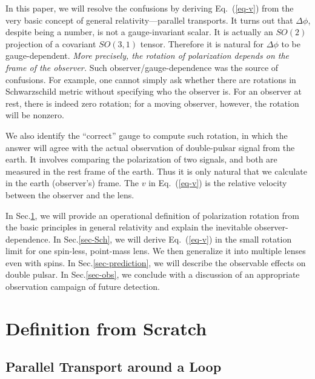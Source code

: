 \documentclass[aps,showpacs,twocolumn,floats,prd,superscriptaddress,nofootinbib]{revtex4-1}
\begin{document}
In this paper, we will resolve the confusions by deriving Eq.~(\ref{eq-v}) from the very basic concept of general relativity---parallel transports. 
It turns out that $\Delta\phi$, despite being a number, is not a gauge-invariant scalar.
It is actually an $SO(2)$ projection of a covariant $SO(3,1)$ tensor.
Therefore it is natural for $\Delta\phi$ to be gauge-dependent.
 {\it More precisely, the rotation of polarization depends on the frame of the observer. }
Such observer/gauge-dependence was the source of confusions.
For example, one cannot simply ask whether there are rotations in Schwarzschild metric without specifying who the observer is.
For an observer at rest, there is indeed zero rotation; 
for a moving observer, however, the rotation will be nonzero.

We also identify the ``correct'' gauge to compute such rotation, in which the answer will agree with the actual observation of double-pulsar signal from the earth.
It involves comparing the polarization of two signals, and both are measured in the rest frame of the earth.
Thus it is only natural that we calculate in the earth (observer's) frame.
The $v$ in Eq.~(\ref{eq-v}) is the relative velocity between the observer and the lens.

In Sec.\ref{sec-born}, we will provide an operational definition of polarization rotation from the basic principles in general relativity and explain the inevitable observer-dependence.
In Sec.\ref{sec-Sch}, we will derive Eq.~(\ref{eq-v}) in the small rotation limit for one spin-less, point-mass lens. 
We then generalize it into multiple lenses even with spins.
In Sec.\ref{sec-prediction}, we will describe the observable effects on double pulsar. 
In Sec.\ref{sec-obs}, we conclude with a discussion of an appropriate observation campaign of future detection.

\section{Definition from Scratch}
\label{sec-born}

\subsection{Parallel Transport around a Loop}
\end{document}
